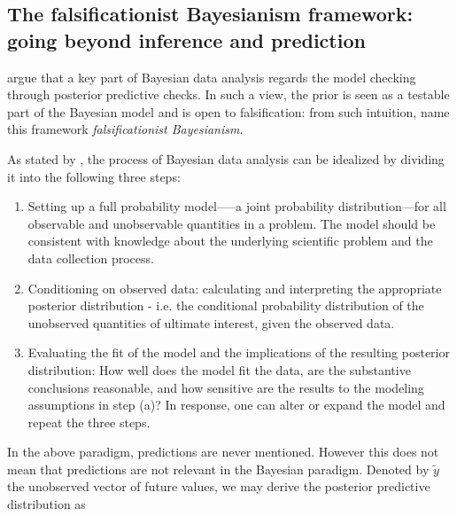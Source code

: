 \documentclass{statsoc}
\begin{document}

\subsection{The falsificationist Bayesianism framework: going beyond inference and prediction}

\cite{gelman2013philosophy} argue that a key part of Bayesian data analysis regards the model checking through posterior predictive checks. In such a view, the prior is seen as a testable part of the Bayesian model and is open to falsification: from such intuition, \cite{gelman2017beyond} name this framework \emph{falsificationist Bayesianism}.

As stated by \cite{gelman2013bayesian}, the process of Bayesian data analysis can be idealized by dividing it into the following three steps:

\begin{enumerate}
\item Setting up a full probability model—--a joint probability distribution---for all observable and unobservable quantities 
           in a problem. The model should be consistent with knowledge about the underlying scientific problem and the data collection 
           process.
\item Conditioning on observed data: calculating and interpreting the appropriate posterior distribution - i.e. the conditional probability 
           distribution of the unobserved quantities of ultimate interest, given the observed data.
\item Evaluating the fit of the model and the implications of the resulting posterior distribution: How well does the model fit the 
           data, are the substantive conclusions reasonable, and how sensitive are the results to the modeling assumptions in step (a)? 
           In response, one can alter or expand the model and repeat the three steps.
\end{enumerate}
%
In the above paradigm, predictions are never mentioned. However this does not mean that predictions are not relevant in the Bayesian paradigm. Denoted by $\tilde{y}$ the unobserved vector of future values, we may derive the posterior predictive distribution as
\end{document}
